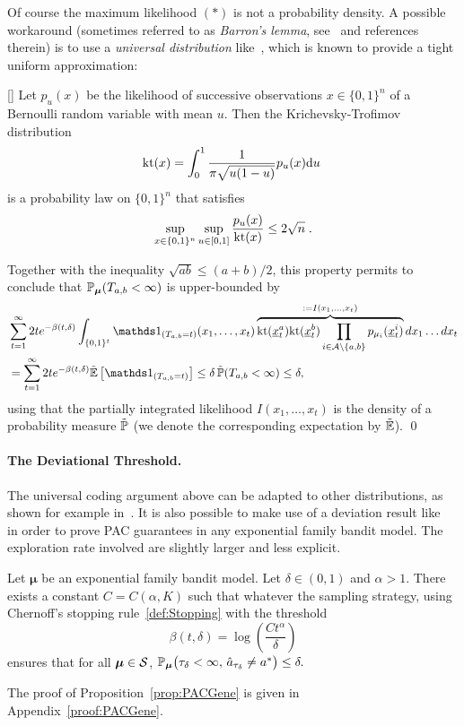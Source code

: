 \documentclass{colt2016} %
\begin{document}
Of course the maximum likelihood $(*)$ is not a probability density. A possible workaround (sometimes referred to as \emph{Barron's lemma}, see~\cite{BRY98} %
and references therein) is to use a \emph{universal distribution} like~\cite{KT81}, which is known to provide a tight uniform approximation:
\begin{lemma}\label{lem:ktMain}[\cite{Willems95thecontext}] Let $p_u(x)$ be the likelihood of successive observations $x \in \{0,1\}^n$ of a Bernoulli random variable with mean $u$. Then the Krichevsky-Trofimov distribution 
 \[\mathrm{kt}(x) = \int_0^1 \frac{1}{\pi\sqrt{u(1-u)}} p_u(x) \mathrm{d} u\;\]
is a probability law on $\{0,1\}^{n}$ that satisfies 
\[ \sup_{x\in\{0,1\}^n} \sup_{u \in[0,1]} \frac{p_u(x)}{\mathrm{kt}(x)}\leq 2\sqrt{n}\;.\]
 \end{lemma}
Together with the inequality $\sqrt{ab}\leq (a+b)/2$, this property permits to conclude that $\mathbb{P}_{\bm \mu}(T_{a,b}< \infty)$ is upper-bounded by 
 \begin{align*}
    &\sum_{t=1}^\infty 2t e^{-\beta(t,\delta)}\int_{\{0,1\}^t}\ind_{(T_{a,b}=t)}(x_1,\dots,x_t) \overbrace{ \kt(\underline{x}^a_t)\kt(\underline{x}^b_t)\prod_{i \in \Arms \setminus\{a,b\}} p_{\mu_i}(\underline{x}_t^i)}^{:=I(x_1,\dots,x_t)}dx_1\dots dx_t \\
  &=  \sum_{t=1}^\infty 2t e^{-\beta(t,\delta)} \tilde{\bE}\left[\ind_{(T_{a,b}=t)}\right] \leq \delta \,\tilde{\bP}(T_{a,b} < \infty) \leq \delta,
\end{align*}
using that the partially integrated likelihood $I(x_1,\dots,x_t)$ is the density of a probability measure $\tilde{\mathbb{P}}$ (we denote the corresponding expectation by $\tilde{\mathbb{E}}$). \qed


\paragraph{The Deviational Threshold.} The universal coding argument above can be adapted to other distributions, as shown for example in~\cite{CGG09}. It is also possible to make use of a deviation result like~\cite{Combes14Lip} in order to prove PAC guarantees in any exponential family bandit model. The exploration rate involved are slightly larger and less explicit. 
\begin{proposition}\label{prop:PACGene} Let $\bm \mu$ be an exponential family bandit model. Let $\delta \in (0,1)$ and $\alpha>1$. There exists a constant $C=C(\alpha,K)$ such that whatever the sampling strategy, using Chernoff's stopping rule~\eqref{def:Stopping} with the threshold
\[\beta(t,\delta)=\log \left(\frac{C t^\alpha}{\delta}\right)\]
ensures that for all $\bm\mu \in \mathcal{S}$, $\mathbb{P}_{\bm\mu}\big(\tau_\delta<\infty, \, \hat{a}_{\tau_\delta} \neq a^*\big) \leq \delta.$
\end{proposition}
The proof of Proposition~\ref{prop:PACGene} is given in Appendix~\ref{proof:PACGene}. 
\end{document}
